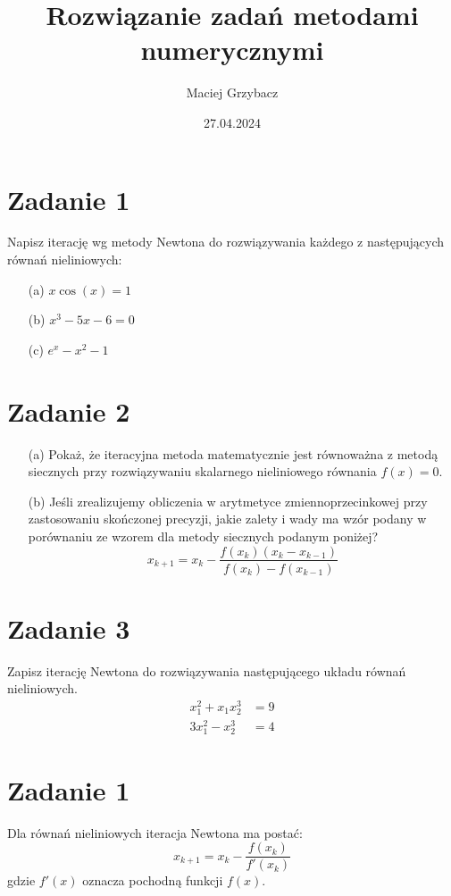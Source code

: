 \documentclass{article}
\begin{document}
\title{Rozwiązanie zadań metodami numerycznymi}
\author{Maciej Grzybacz}
\date{27.04.2024}
\maketitle

\section*{Zadanie 1}
Napisz iterację wg metody Newtona do rozwiązywania każdego z następujących równań nieliniowych:
\begin{itemize}
    \item[(a)] \( x \cos(x) = 1 \)
    \item[(b)] \( x^3 - 5x - 6 = 0 \)
    \item[(c)] \( e^x - x^2 - 1 \)
\end{itemize}

\section*{Zadanie 2}
\begin{itemize}
    \item[(a)] Pokaż, że iteracyjna metoda matematycznie jest równoważna z metodą siecznych przy rozwiązywaniu skalarnego nieliniowego równania \( f(x) = 0 \).
    \item[(b)] Jeśli zrealizujemy obliczenia w arytmetyce zmiennoprzecinkowej przy zastosowaniu skończonej precyzji, jakie zalety i wady ma wzór podany w porównaniu ze wzorem dla metody siecznych podanym poniżej?
    \[ x_{k+1} = x_k - \frac{f(x_k)(x_k - x_{k-1})}{f(x_k) - f(x_{k-1})} \]
\end{itemize}

\section*{Zadanie 3}
Zapisz iterację Newtona do rozwiązywania następującego układu równań nieliniowych.
\begin{align*}
    x_1^2 + x_1 x_2^3 &= 9 \\
    3x_1^2 - x_2^3 &= 4
\end{align*}


\section*{Zadanie 1}

Dla równań nieliniowych iteracja Newtona ma postać:
\[ x_{k+1} = x_k - \frac{f(x_k)}{f'(x_k)} \]
gdzie \( f'(x) \) oznacza pochodną funkcji \( f(x) \).
\end{document}
